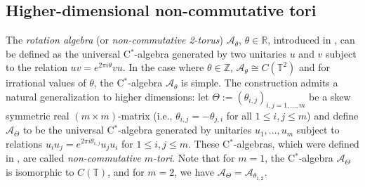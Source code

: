 \documentclass[a4paper,11pt,reqno]{amsart}
\numberwithin{equation}{section}
\numberwithin{equation}{section}
\theoremstyle{definition}
\theoremstyle{remark}
\theoremstyle{remark}
\begin{document}
\vspace{3mm}


\subsection{Higher-dimensional non-commutative tori}

The \emph{rotation algebra} (or \emph{non-commutative 2-torus}) $\mathcal{A}_{\theta}$,
$\theta\in\mathbb{R}$, introduced in \cite{Rieffel81}, can be defined
as the universal C$^{\ast}$-algebra generated by two unitaries $u$
and $v$ subject to the relation $uv=e^{2\pi i\theta}vu$. In the
case where $\theta\in\mathbb{Z}$, $\mathcal{A}_{\theta}\cong C(\mathbb{T}^{2})$
and for irrational values of $\theta$, the C$^{\ast}$-algebra $\mathcal{A}_{\theta}$
is simple. The construction admits a natural generalization to higher
dimensions: let $\Theta:=(\theta_{i,j})_{i,j=1,...,m}$ be a skew
symmetric real $(m\times m)$-matrix (i.e., $\theta_{i,j}=-\theta_{j,i}$
for all $1\leq i,j\leq m$) and define $\mathcal{A}_{\Theta}$ to
be the universal C$^{\ast}$-algebra generated by unitaries $u_{1},...,u_{m}$
subject to relations $u_{i}u_{j}=e^{2\pi i\theta_{i,j}}u_{j}u_{i}$
for $1\leq i,j\leq m$. These C$^{\ast}$-algebras, which were defined
in \cite{Rieffel90}, are called \emph{non-commutative $m$-tori}.
Note that for $m=1$, the C$^{\ast}$-algebra $\mathcal{A}_{\Theta}$
is isomorphic to $C(\mathbb{T})$, and for $m=2$, we have $\mathcal{A}_{\Theta}=\mathcal{A}_{\theta_{1,2}}$.
\end{document}
